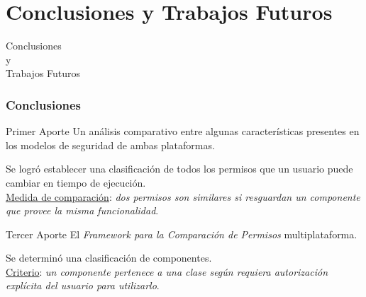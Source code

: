 \section{Conclusiones y Trabajos Futuros}
\begin{frame}
 \begin{center}
  \LARGE Conclusiones\\ y\\ Trabajos Futuros
 \end{center}
\end{frame}
\begin{frame}
 \frametitle{Conclusiones}
 \begin{footnotesize}
 \begin{exampleblock}{Primer Aporte}
Un análisis comparativo entre algunas características presentes en los modelos de seguridad de ambas plataformas.
 \end{exampleblock}\pause
 \begin{exampleblock}{}
Se logró establecer una clasificación de todos los permisos que un usuario puede cambiar en tiempo de ejecución.\\ \underline{Medida de comparación}: \emph{dos permisos son similares si resguardan un componente que provee la misma funcionalidad}.\\ 
 \end{exampleblock}\pause
 \begin{exampleblock}{Tercer Aporte}
El \emph{Framework para la Comparación de Permisos} multiplataforma.
 \end{exampleblock} \pause
 \begin{exampleblock}{}
Se determinó una clasificación de componentes.\\ \underline{Criterio}: \emph{un componente pertenece a una clase según requiera autorización explícita del usuario para utilizarlo}.
 \end{exampleblock}
 \end{footnotesize}
\end{frame}
